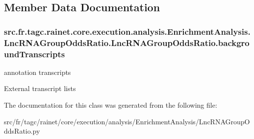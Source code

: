 \subsection{Member Data Documentation}
\hypertarget{classsrc_1_1fr_1_1tagc_1_1rainet_1_1core_1_1execution_1_1analysis_1_1EnrichmentAnalysis_1_1LncRN93e4a312e019c4b142d886126e1373f6_a2e1af37469e9a8f2edd6287852d15571}{
\subsubsection[{background\-Transcripts}]{\setlength{\rightskip}{0pt plus 5cm}src.\-fr.\-tagc.\-rainet.\-core.\-execution.\-analysis.\-Enrichment\-Analysis.\-Lnc\-R\-N\-A\-Group\-Odds\-Ratio.\-Lnc\-R\-N\-A\-Group\-Odds\-Ratio.\-background\-Transcripts}}\label{classsrc_1_1fr_1_1tagc_1_1rainet_1_1core_1_1execution_1_1analysis_1_1EnrichmentAnalysis_1_1LncRN93e4a312e019c4b142d886126e1373f6_a2e1af37469e9a8f2edd6287852d15571}


annotation transcripts 

External transcript lists 

The documentation for this class was generated from the following file\-:\begin{DoxyCompactItemize}
\item 
src/fr/tagc/rainet/core/execution/analysis/\-Enrichment\-Analysis/Lnc\-R\-N\-A\-Group\-Odds\-Ratio.\-py\end{DoxyCompactItemize}
